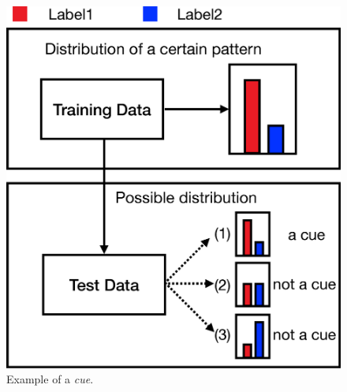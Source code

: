 %

\begin{figure}[th]
\centering
\includegraphics[width=0.45\columnwidth]{picture/cue_def.eps}
\caption{Example of a {\em cue}. }
\label{fig:cue_def}
\end{figure}

